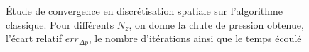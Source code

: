 \begin{figure}
    \centering
    \resizebox{0.8\linewidth}{!}{}
    \caption{Étude de convergence en discrétisation spatiale sur l'algorithme classique. Pour différents $N_z$, on donne la chute de pression obtenue, l'écart relatif $err_{\Delta p}$, le nombre d'itérations ainsi que le temps écoulé}
    \label{fig:ConvAlgoClassique}
\end{figure}